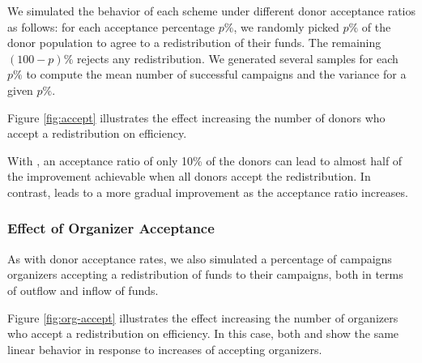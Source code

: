 We simulated the behavior of each scheme under different donor acceptance ratios as follows: for each acceptance percentage $p\%$, we randomly picked $p\%$ of the donor population to agree to a redistribution of their funds. The remaining $(100 - p)\%$ rejects any redistribution. We generated several samples for each $p\%$ to compute the mean number of successful campaigns and the variance for a given $p\%$. 

Figure \ref{fig:accept} illustrates the effect increasing the number of donors who accept a redistribution on efficiency. 

With \car, an acceptance ratio of only 10\% of the donors can lead to almost half of the improvement achievable when all donors accept the redistribution. In contrast, \cpr leads to a more gradual improvement as the acceptance ratio increases.

\subsubsection{Effect of Organizer Acceptance}
As with donor acceptance rates, we also simulated a percentage of campaigns organizers accepting a redistribution of funds to their campaigns, both in terms of outflow and inflow of funds.

Figure \ref{fig:org-accept} illustrates the effect increasing the number of organizers who accept a redistribution on efficiency. In this case, both \car and \cpr show the same linear behavior in response to increases of accepting organizers.
